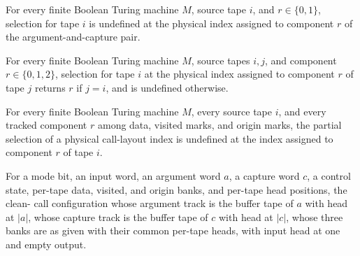 \begin{lemma}
\label{Turing.FinTM.emCall_triple_pair}
\leanok
{}
For every finite Boolean Turing machine $M$, source tape $i$, and $r\in\{0,1\}$,
selection for tape $i$ is undefined at the physical index assigned to component $r$ of
the argument-and-capture pair.
\end{lemma}

\begin{lemma}
\label{Turing.FinTM.emCall_triple_other}
\leanok
{}
For every finite Boolean Turing machine $M$, source tapes $i,j$, and component
$r\in\{0,1,2\}$, selection for tape $i$ at the physical index assigned to component $r$
of tape $j$ returns $r$ if $j=i$, and is undefined otherwise.
\end{lemma}

\begin{lemma}
\label{Turing.FinTM.emCall_pair_triple}
\leanok
{}
For every finite Boolean Turing machine $M$, every source tape $i$, and every tracked
component $r$ among data, visited marks, and origin marks, the partial selection of a
physical call-layout index is undefined at the index assigned to component $r$ of tape
$i$.
\end{lemma}

\begin{definition}
\label{Turing.FinTM.emCallFrame}
\leanok
{}
For a mode bit, an input word, an argument word $a$, a capture word $c$, a control
state, per-tape data, visited, and origin banks, and per-tape head positions, the clean-
call configuration whose argument track is the buffer tape of $a$ with head at $|a|$,
whose capture track is the buffer tape of $c$ with head at $|c|$, whose three banks are
as given with their common per-tape heads, with input head at one and empty output.
\end{definition}

